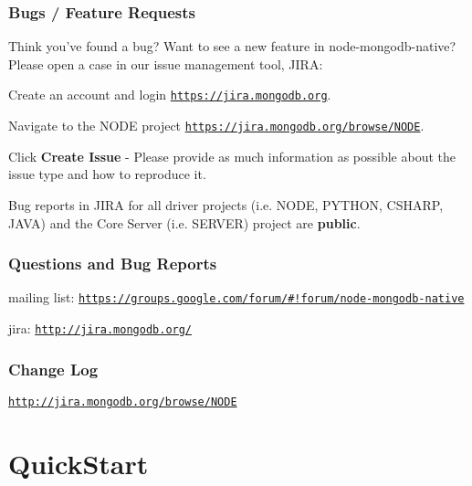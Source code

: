 \subsubsection*{Bugs / Feature Requests}

Think you’ve found a bug? Want to see a new feature in node-\/mongodb-\/native? Please open a case in our issue management tool, J\+I\+RA\+:


\begin{DoxyItemize}
\item Create an account and login \href{https://jira.mongodb.org}{\tt https\+://jira.\+mongodb.\+org}.
\item Navigate to the N\+O\+DE project \href{https://jira.mongodb.org/browse/NODE}{\tt https\+://jira.\+mongodb.\+org/browse/\+N\+O\+DE}.
\item Click {\bfseries Create Issue} -\/ Please provide as much information as possible about the issue type and how to reproduce it.
\end{DoxyItemize}

Bug reports in J\+I\+RA for all driver projects (i.\+e. N\+O\+DE, P\+Y\+T\+H\+ON, C\+S\+H\+A\+RP, J\+A\+VA) and the Core Server (i.\+e. S\+E\+R\+V\+ER) project are {\bfseries public}.

\subsubsection*{Questions and Bug Reports}


\begin{DoxyItemize}
\item mailing list\+: \href{https://groups.google.com/forum/#!forum/node-mongodb-native}{\tt https\+://groups.\+google.\+com/forum/\#!forum/node-\/mongodb-\/native}
\item jira\+: \href{http://jira.mongodb.org/}{\tt http\+://jira.\+mongodb.\+org/}
\end{DoxyItemize}

\subsubsection*{Change Log}

\href{http://jira.mongodb.org/browse/NODE}{\tt http\+://jira.\+mongodb.\+org/browse/\+N\+O\+DE}

\section*{Quick\+Start}

